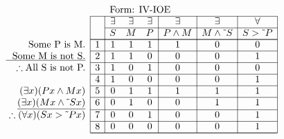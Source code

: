 \documentclass[10pt,legalpaper,landscape,cmtt]{article}
\begin{document}
{\begin{minipage}[t]{3.25in}
	\(
	\begin{array}{r|c|ccc|c|c|c|}
		\multicolumn{2}{c}{}&\multicolumn{6}{l}{\mbox{Form: IV-IOE}} \\ \cline{2-8}
		\hspace{1in}	&	& \exists & \exists & \exists & \exists & \exists & \forall\\ \cline{3-8}
		&	& S & M & P &  P \wedge M  &  M \wedge \tilde~S  &  S > \tilde~P \\ \cline{2-8} \cline{2-8}
		\phantom{\therefore}\mbox{Some P is M.}   & 1 & 1 & 1 & 1 &   1   &   0   &   0  \\ \cline{2-8}
		\underline{\phantom{\therefore}\mbox{Some M is not S.}}   & 2 & 1 & 1 & 0 &   0   &   0   &   1  \\ \cline{2-8}
		\therefore \mbox{All S is not P.}   & 3 & 1 & 0 & 1 &   0   &   0   &   0  \\ \cline{2-8}
		& 4 & 1 & 0 & 0 &   0   &   0   &   1  \\ \cline{2-8}
		(\exists x)(Px \wedge Mx)   & 5 & 0 & 1 & 1 &   1   &   1   &   1  \\ \cline{2-8}
		\underline{(\exists x)(Mx \wedge \tilde~Sx)}   & 6 & 0 & 1 & 0 &   0   &   1   &   1  \\ \cline{2-8}
		\therefore(\forall x)(Sx > \tilde~Px)   & 7 & 0 & 0 & 1 &   0   &   0   &   1  \\ \cline{2-8}
		& 8 & 0 & 0 & 0 &   0   &   0   &   1   \\ \cline{2-8}\cline{2-8} 
	\end{array}
	\)
\end{minipage}

}
\end{document}
